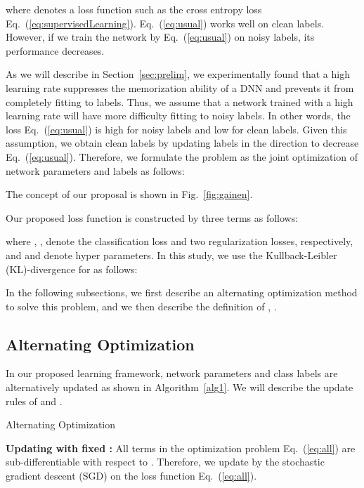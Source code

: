 \documentclass[10pt,twocolumn,letterpaper]{article}
\newcommand{\Eref}[1]{Eq.~(\ref{#1})}
\newcommand{\Fref}[1]{Fig.~\ref{#1}}
\newcommand{\Aref}[1]{Algorithm~\ref{#1}}
\newcommand{\Sref}[1]{Section~\ref{#1}}
\begin{document}
where  denotes a loss function such as the cross entropy loss \Eref{eq:supervisedLearning}. \Eref{eq:usual} works well on clean labels. However, if we train the network by \Eref{eq:usual} on noisy labels, its performance decreases.

As we will describe in \Sref{sec:prelim}, we experimentally found that a high learning rate suppresses the memorization ability of a DNN and prevents it from completely fitting to labels. Thus, we assume that a network trained with a high learning rate will have more difficulty fitting to noisy labels. In other words, the loss \Eref{eq:usual} is high for noisy labels and low for clean labels. Given this assumption, we obtain clean labels by updating labels in the direction to decrease \Eref{eq:usual}. Therefore, we formulate the problem as the joint optimization of network parameters and labels as follows:

The concept of our proposal is shown in \Fref{fig:gainen}.

Our proposed loss function  is constructed by three terms as follows:

where , ,  denote the classification loss and two regularization losses, respectively, and  and  denote hyper parameters.
In this study, we use the Kullback-Leibler (KL)-divergence for  as follows:


In the following subsections, we first describe an alternating optimization method to solve this problem, and we then describe the definition of , .

\subsection{Alternating Optimization}\label{sec:alt}
In our proposed learning framework, network parameters  and class labels  are alternatively updated as shown in \Aref{alg1}.
We will describe the update rules of  and .

\addtolength\textfloatsep{-5mm}
\begin{algorithm}[t]
	\caption{Alternating Optimization}
	\label{alg1}
	\begin{algorithmic}
		\STATE 
		\STATE 
    \STATE 
		\ENDFOR
	\end{algorithmic}
\end{algorithm}

\vspace{2mm}\noindent\textbf{Updating  with fixed :}
All terms in the optimization problem \Eref{eq:all} are sub-differentiable with respect to . Therefore, we update  by the stochastic gradient descent (SGD) on the loss function \Eref{eq:all}.
\end{document}
